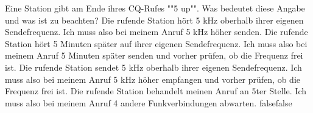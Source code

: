     {Eine Station gibt am Ende ihres CQ-Rufes ""5 up"". Was bedeutet diese Angabe und was ist zu beachten?}
    {Die rufende Station hört 5 kHz oberhalb ihrer eigenen Sendefrequenz. Ich muss also bei meinem Anruf 5 kHz höher senden.}
    {Die rufende Station hört 5 Minuten später auf ihrer eigenen Sendefrequenz. Ich muss also bei meinem Anruf 5 Minuten später senden und vorher prüfen, ob die Frequenz frei ist.}
    {Die rufende Station sendet 5 kHz oberhalb ihrer eigenen Sendefrequenz. Ich muss also bei meinem Anruf 5 kHz höher empfangen und vorher prüfen, ob die Frequenz frei ist.}
    {Die rufende Station behandelt meinen Anruf an 5ter Stelle. Ich muss also bei meinem Anruf 4 andere Funkverbindungen abwarten.}
    {false}{false}